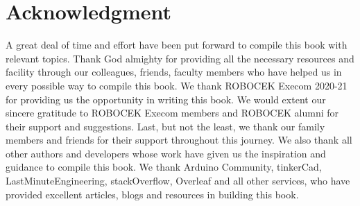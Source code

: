 \chapter*{Acknowledgment}
\begin{fullwidth}
	\begin{doublespace}
		\justify
		\par A great deal of time and effort have been put forward to compile this book with relevant topics. Thank God almighty for providing all the necessary resources and facility through our colleagues, friends, faculty members who have helped us in every possible way to compile this book. We thank ROBOCEK Execom 2020-21 for providing us the opportunity in writing this book. We would extent our sincere gratitude to ROBOCEK Execom members and ROBOCEK alumni for their support and suggestions. Last, but not the least, we thank our family members and friends for their support throughout this journey. We also thank all other authors and developers whose work have given us the inspiration and guidance to compile this book. We thank Arduino Community, tinkerCad, LastMinuteEngineering, stackOverflow, Overleaf and all other services, who have provided excellent articles, blogs and resources in building this book.
	\end{doublespace}
\end{fullwidth}